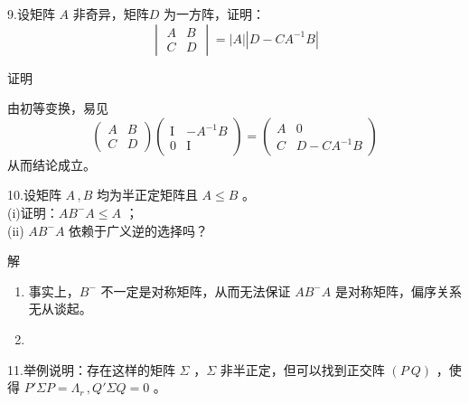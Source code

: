 \documentclass[12pt,hyperref,]{ctexart}
\begin{document}
\vspace{3em}

\kaishu

9.设矩阵 \(A\) 非奇异，矩阵\(D\) 为一方阵，证明： \begin{equation*}
\begin{vmatrix}
A & B \\
C & D
\end{vmatrix}=|A||D-CA^{-1}B|
\end{equation*} \vspace{1em}

\heiti

证明

\songti

由初等变换，易见 \begin{equation*}
\begin{pmatrix}
A & B \\
C & D
\end{pmatrix}
\begin{pmatrix}
\mathrm{I} & -A^{-1}B \\
0 & \mathrm{I}
\end{pmatrix}=
\begin{pmatrix}
A & 0 \\
C & D-CA^{-1}B
\end{pmatrix}
\end{equation*}从而结论成立。

\vspace{3em}

\kaishu

10.设矩阵 \(A\, ,B\) 均为半正定矩阵且 \(A\le B\) 。\\
(i)证明：\(AB^-A\le A\) ；\\
(ii) \(AB^-A\) 依赖于广义逆的选择吗？ \vspace{1em}

\heiti

解

\songti

\begin{enumerate}
\def\labelenumi{(\roman{enumi})}
\item
  事实上，\(B^-\) 不一定是对称矩阵，从而无法保证 \(AB^-A\)
  是对称矩阵，偏序关系无从谈起。
\item
\end{enumerate}

\vspace{3em}

\kaishu

11.举例说明：存在这样的矩阵 \(\Sigma\) ，\(\Sigma\)
非半正定，但可以找到正交阵 \((P\  Q)\) ，使得
\(P'\Sigma P=\Lambda_r\, ,Q'\Sigma Q=0\) 。 \vspace{1em}
\end{document}
